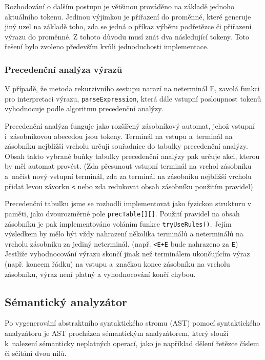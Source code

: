 \documentclass[12pt,a4paper,titlepage,final]{article}
\begin{document}
Rozhodování o dalším postupu je většinou prováděno na základě jednoho
aktuálního tokenu. Jedinou výjimkou je přiřazení do proměnné, které
generuje jiný uzel na základě toho, zda se jedná o příkaz výběru podřetězce
či přiřazení výrazu do proměnné. Z tohoto důvodu musí znát dva následující
tokeny. Toto řešení bylo zvoleno především kvůli jednoduchosti implementace.

\subsubsection{Precedenční analýza výrazů}
V případě, že metoda rekurzivního sestupu narazí na neterminál E, zavolá funkci
pro interpretaci výrazu, \texttt{parseExpression}, která dále vstupní posloupnost
tokenů vyhodnocuje podle algoritmu precedenční analýzy.

Precedenční analýza funguje jako rozšířený zásobníkový automat, jehož vstupní 
i~zá\-so\-bní\-ko\-vou abecedou jsou tokeny. Terminál na vstupu a~terminál na zásobníku
nejbližší vrcholu určují souřadnice do tabulky precedenční analýzy.
Obsah takto vybrané buňky tabulky precedenční analýzy pak určuje akci, kterou
by měl automat provést. (Zda přesunout vstupní terminál na vrchol zásobníku a~načíst 
nový vstupní terminál, zda za terminál na zásobníku nejbližší vrcholu přidat
levou závorku \texttt{<} nebo zda redukovat obsah zásobníku použitím pravidel)

Precedenční tabulku jsme se rozhodli implementovat jako fyzickou strukturu v paměti,
jako dvourozměrné pole \texttt{precTable[][]}. Použití pravidel na obsah zásobníku je
pak implementováno voláním funkce \texttt{tryUseRules()}. Jejím výsledkem by mělo být
vždy nahrazení několika terminálů a neterminálů na vrcholu zásobníku za jediný
neterminál. (např. \texttt{<E+E} bude nahrazeno za \texttt{E}) Jestliže vyhodnocování
výrazu skončí jinak než terminálem ukončujícím výraz (např. koncem řádku) na vstupu 
a~značkou konce zásobníku na vrcholu zásobníku, výraz není platný a vyhodnocování
končí chybou.
\subsection{Sémantický analyzátor}
Po vygenerování abstraktního syntaktického stromu (AST) pomocí syntaktického analyzátoru 
je AST procházen sémantickým analyzátorem, který slouží k~nalezení sémanticky 
neplatných operací, jako je například dělení řetězce číslem či sčítání dvou nilů.
\end{document}
